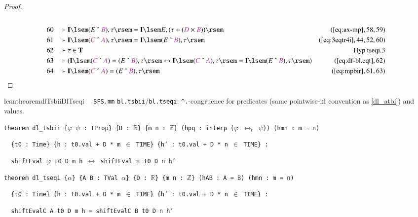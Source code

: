\begin{proof}
\begin{align}
  \\ 60 &&  & \vdash \mathbf{I} \lsem ( E ~\string^~ \mc{B} ) , \tau \rsem =
      \mathbf{I} \lsem E , ( \tau + ( \mc{D} \times \mc{B} )
      ) \rsem&(\mbox{\ref{eq:ax-mp}},58,59)\notag
  \\ 61 &&  & \vdash \mathbf{I} \lsem ( \mc{C} ~\string^~ \mc{A} ) , \tau \rsem
      = \mathbf{I} \lsem ( E ~\string^~ \mc{B} ) , \tau
      \rsem&(\mbox{\ref{eq:3eqtr4i}},44,52,60)\notag
  \\ 62 &&  & \vdash \tau \in \mathbf{T}&\text{Hyp~tseqi.3}\notag%
  \\ 63 &&  & \vdash ( \mathbf{I} \lsem ( \mc{C} ~\string^~ \mc{A} ) = ( E
      ~\string^~ \mc{B} ) , \tau \rsem \leftrightarrow
      \mathbf{I} \lsem ( \mc{C} ~\string^~ \mc{A} ) , \tau
      \rsem = \mathbf{I} \lsem ( E ~\string^~ \mc{B} ) ,
      \tau \rsem )&(\mbox{\ref{eq:df-bl.eqt}},62)\notag
  \\ 64 &&  & \vdash \mathbf{I} \lsem ( \mc{C} ~\string^~ \mc{A} ) = ( E
      ~\string^~ \mc{B} ) , \tau
      \rsem&(\mbox{\ref{eq:mpbir}},61,63)\notag
\end{align}
\end{proof}

\begin{restatable}{leantheorem}{dlTsbiiDlTseqi}~~ \texttt{SFS.mm} \texttt{bl.tsbii}/\texttt{bl.tseqi}: \texttt{\^{}.}-congruence for predicates (same pointwise-iff convention as \ref{dl_atbi}) and values.

\texttt{\textcolor{leancolor}{theorem} \textcolor{leanyellow}{dl\_tsbii} \{$\varphi$ $\psi$ : TProp\} \{D : $\mathbb{R}$\} \{m n : $\mathbb{Z}$\} (hpq : interp ($\varphi$ $\leftrightarrow_t$ $\psi$)) (hmn : m = n)}

\texttt{~~\{t0 : Time\} \{h : t0.val + D * m $\in$ TIME\} \{h' : t0.val + D * n $\in$ TIME\} :}

\texttt{~~shiftEval $\varphi$ t0 D m h $\leftrightarrow$ shiftEval $\psi$ t0 D n h'}

\texttt{\textcolor{leancolor}{theorem} \textcolor{leanyellow}{dl\_tseqi} \{$\alpha$\} \{A B : TVal $\alpha$\} \{D : $\mathbb{R}$\} \{m n : $\mathbb{Z}$\} (hAB : A = B) (hmn : m = n)}

\texttt{~~\{t0 : Time\} \{h : t0.val + D * m $\in$ TIME\} \{h' : t0.val + D * n $\in$ TIME\} :}

\texttt{~~shiftEvalC A t0 D m h = shiftEvalC B t0 D n h'}
\label{dl_tsbii}
\label{dl_tseqi}
\end{restatable}

